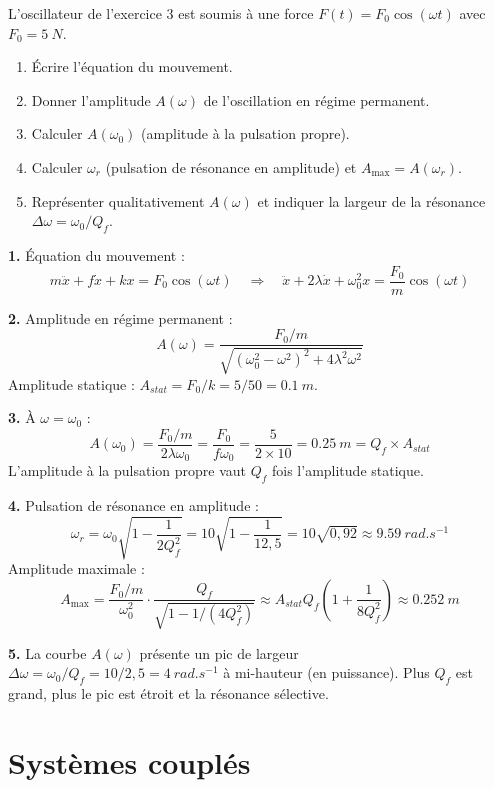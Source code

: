 \documentclass[12pt,a4paper]{article}
\begin{document}
\begin{boiteexercice}
L'oscillateur de l'exercice 3 est soumis à une force $F(t) = F_0\cos(\omega t)$ avec $F_0 = \qty{5}{N}$.
\begin{enumerate}
  \item Écrire l'équation du mouvement.
  \item Donner l'amplitude $A(\omega)$ de l'oscillation en régime permanent.
  \item Calculer $A(\omega_0)$ (amplitude à la pulsation propre).
  \item Calculer $\omega_r$ (pulsation de résonance en amplitude) et $A_{\max} = A(\omega_r)$.
  \item Représenter qualitativement $A(\omega)$ et indiquer la largeur de la résonance $\Delta\omega = \omega_0/Q_f$.
\end{enumerate}
\end{boiteexercice}

\begin{boitecorrige}
\textbf{1.} Équation du mouvement :
\[
m\ddot x + f\dot x + kx = F_0\cos(\omega t) \quad\Longrightarrow\quad \ddot x + 2\lambda\dot x + \omega_0^2 x = \frac{F_0}{m}\cos(\omega t)
\]

\textbf{2.} Amplitude en régime permanent :
\[
A(\omega) = \frac{F_0/m}{\sqrt{(\omega_0^2-\omega^2)^2 + 4\lambda^2\omega^2}}
\]
Amplitude statique : $A_{stat} = F_0/k = 5/50 = \qty{0.1}{m}$.

\textbf{3.} À $\omega = \omega_0$ :
\[
A(\omega_0) = \frac{F_0/m}{2\lambda\omega_0} = \frac{F_0}{f\omega_0} = \frac{5}{2\times10} = \qty{0.25}{m} = Q_f\times A_{stat}
\]
L'amplitude à la pulsation propre vaut $Q_f$ fois l'amplitude statique.

\textbf{4.} Pulsation de résonance en amplitude :
\[
\omega_r = \omega_0\sqrt{1-\frac{1}{2Q_f^2}} = 10\sqrt{1-\frac{1}{12{,}5}} = 10\sqrt{0{,}92} \approx \qty{9.59}{rad.s^{-1}}
\]
Amplitude maximale :
\[
A_{\max} = \frac{F_0/m}{\omega_0^2}\cdot\frac{Q_f}{\sqrt{1-1/(4Q_f^2)}} \approx A_{stat}Q_f\left(1+\frac{1}{8Q_f^2}\right) \approx \qty{0.252}{m}
\]

\textbf{5.} La courbe $A(\omega)$ présente un pic de largeur $\Delta\omega = \omega_0/Q_f = 10/2{,}5 = \qty{4}{rad.s^{-1}}$ à mi-hauteur (en puissance). Plus $Q_f$ est grand, plus le pic est étroit et la résonance sélective.
\end{boitecorrige}

\section{Systèmes couplés}
\end{document}

